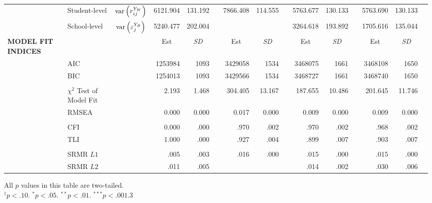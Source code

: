{\begin{tabular}{l @{\hskip -7.9cm} l c rr @{\hskip -0.1mm}l rr @{\hskip -0.1mm}l rr @{\hskip -0.1mm}l rr @{\hskip -0.1mm}l}
    & Student-level & $\text{var}\left(r^{Y_W}_{ij}\right)$ & 6121.904 & 131.192 &       & 7866.408 & 114.555 &       & 5763.677 & 130.133 &       & 5763.690 & 130.133 &  \\
    & School-level & $\text{var}\left(\varepsilon^{Y_B}_j\right)$ & 5240.477 & 202.004 &       &       &       &       & 3264.618 & 193.892 &       & 1705.616 & 135.044 &  \\
\midrule
    \textbf{MODEL FIT INDICES} &       &       & \multicolumn{1}{c}{Est} & \multicolumn{1}{c}{\textit{SD}} &       & \multicolumn{1}{c}{Est} & \multicolumn{1}{c}{\textit{SD}} &       & \multicolumn{1}{c}{Est} & \multicolumn{1}{c}{\textit{SD}} &       & \multicolumn{1}{c}{Est} & \multicolumn{1}{c}{\textit{SD}} &  \\
    \cmidrule{4-5}\cmidrule{7-8}\cmidrule{10-11}\cmidrule{13-14}          & AIC   &       & 1253984 & 1093  &       & 3429058 & 1534  &       & 3468075 & 1661  &       & 3468108 & 1650  &  \\
    & BIC   &       & 1254013 & 1093  &       & 3429566 & 1534  &       & 3468727 & 1661  &       & 3468740 & 1650  &  \\
    &&&&&&&&&&&&&&\\
    & $\chi^2$ Test of Model Fit &       & 2.193 & 1.468 &       & 304.405 & 13.167 &       & 187.655 & 10.486 &       & 201.645 & 11.746 &  \\
    & RMSEA &       & 0.000 & 0.000 &       & 0.017 & 0.000 &       & 0.009 & 0.000 &       & 0.009 & 0.000 &  \\
    &&&&&&&&&&&&&&\\
    & CFI   &       & 0.000 & .000 &       & .970 & .002 &       & .970 & .002 &       & .968 & .002 &  \\
    & TLI   &       & 1.000 & .000 &       & .927 & .004 &       & .899 & .007 &       & .903 & .007 &  \\
    &&&&&&&&&&&&&&\\
    & SRMR $L1$ &       & .005 & .003 &       & .016 & .000 &       & .015 & .000 &       & .015 & .000 &  \\
    & SRMR $L2$ &       & .011 & .005 &       &       &       &       & .014 & .002 &       & .030 & .006 &  \\
\bottomrule
    \end{tabular}
}{All $p$ values in this table are two-tailed.\\
$^\dagger p < .10$. $^* p < .05$. $^{**} p < .01$. $^{***} p < .001$.}{3}
